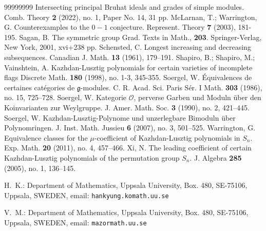 \documentclass[a4paper]{amsart}
\begin{document}
\begin{thebibliography}{99999999}
Intersecting principal Bruhat ideals and grades of simple modules.
Comb. Theory {\bf 2} (2022), no. 1, Paper No. 14, 31 pp.
McLarnan, T.; Warrington, G.
Counterexamples to the $0-1$ conjecture.
Represent. Theory {\bf 7} (2003), 181-195.
Sagan, B. The symmetric group
Grad. Texts in Math., {\bf 203}.
Springer-Verlag, New York, 2001, xvi+238 pp.
Schensted, C.
Longest increasing and decreasing subsequences.
Canadian J. Math. {\bf 13} (1961), 179--191.
Shapiro, B.; Shapiro, M.; Vainshtein, A.
Kazhdan-Lusztig polynomials for certain varieties of incomplete flags
Discrete Math. {\bf 180} (1998), no. 1-3, 345-355.
 Soergel, W.
{\'E}quivalences de certaines cat{\'e}gories de $\mathfrak{g}$-modules.
C. R. Acad. Sci. Paris S{\'e}r. I Math. {\bf 303} (1986), no. 15, 725--728.
 Soergel, W. Kategorie $\mathcal{O}$, perverse Garben 
und Moduln {\"u}ber den Koinvarianten zur Weylgruppe. J. Amer. Math. Soc. 
{\bf 3} (1990), no. 2, 421--445. 
Soergel, W.
Kazhdan-Lusztig-Polynome und unzerlegbare Bimoduln über Polynomringen.
J. Inst. Math. Jussieu {\bf 6} (2007), no. 3, 501--525.
Warrington, G.
Equivalence classes for the $\mu$-coefficient of Kazhdan-Lusztig 
polynomials in $S_n$. Exp. Math. {\bf 20} (2011), no. 4, 457--466.
Xi, N.
The leading coefficient of certain Kazhdan-Lusztig 
polynomials of the permutation group $S_n$.
J. Algebra {\bf 285} (2005), no. 1, 136--145.
\end{thebibliography}
\vspace{2mm}

\noindent
H.~K.: Department of Mathematics, Uppsala University, Box. 480,
SE-75106, Uppsala, SWEDEN, email: {\tt hankyung.komath.uu.se}

\noindent
V.~M.: Department of Mathematics, Uppsala University, Box. 480,
SE-75106, Uppsala, SWEDEN, email: {\tt mazormath.uu.se}

% 
\end{document}
